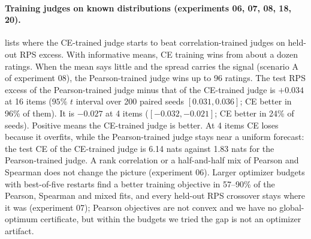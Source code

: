 \paragraph{Training judges on known distributions (experiments 06, 07, 08, 18, 20).}
 lists where the CE-trained judge starts to beat correlation-trained judges on held-out RPS excess.
With informative means, CE training wins from about a dozen ratings.
When the mean says little and the spread carries the signal (scenario A of experiment 08), the Pearson-trained judge wins up to 96 ratings.
The test RPS excess of the Pearson-trained judge minus that of the CE-trained judge is $+0.034$ at 16 items ($95\%$ $t$ interval over 200 paired seeds $[0.031,0.036]$; CE better in 96\% of them). It is $-0.027$ at 4 items ($[-0.032,-0.021]$; CE better in 24\% of seeds). Positive means the CE-trained judge is better.
At 4 items CE loses because it overfits, while the Pearson-trained judge stays near a uniform forecast: the test CE of the CE-trained judge is 6.14 nats against 1.83 nats for the Pearson-trained judge.
A rank correlation or a half-and-half mix of Pearson and Spearman does not change the picture (experiment 06).
Larger optimizer budgets with best-of-five restarts find a better training objective in 57--90\% of the Pearson, Spearman and mixed fits, and every held-out RPS crossover stays where it was (experiment 07); Pearson objectives are not convex and we have no global-optimum certificate, but within the budgets we tried the gap is not an optimizer artifact.

